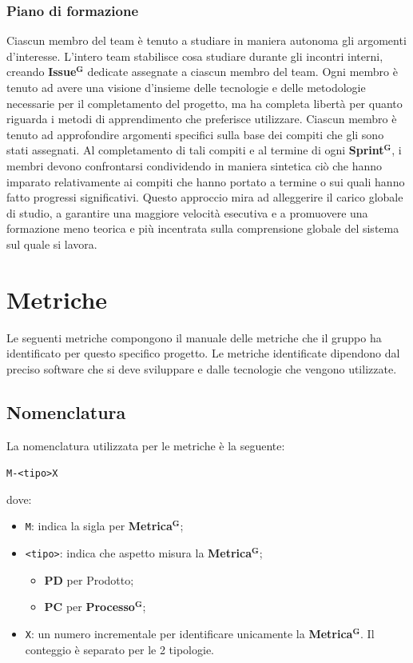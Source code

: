 \documentclass[a4paper,12pt]{article}
\newcommand{\term}[1]{\textbf{#1}$^\mathbf{G}$}
\begin{document}
\subsubsection{Piano di formazione}
Ciascun membro del team è tenuto a studiare in maniera autonoma gli argomenti d'interesse. L'intero team stabilisce cosa studiare durante gli incontri interni, creando \term{Issue} dedicate assegnate a ciascun membro del team. Ogni membro è tenuto ad avere una visione d'insieme delle tecnologie e delle metodologie necessarie per il completamento del progetto, ma ha completa libertà per quanto riguarda i metodi di apprendimento che preferisce utilizzare. Ciascun membro è tenuto ad approfondire argomenti specifici sulla base dei compiti che gli sono stati assegnati. Al completamento di tali compiti e al termine di ogni \term{Sprint}, i membri devono confrontarsi condividendo in maniera sintetica ciò che hanno imparato relativamente ai compiti che hanno portato a termine o sui quali hanno fatto progressi significativi. Questo approccio mira ad alleggerire il carico globale di studio, a garantire una maggiore velocità esecutiva e a promuovere una formazione meno teorica e più incentrata sulla comprensione globale del sistema sul quale si lavora. 

\section{Metriche} \label{sec:elenco-metriche}
Le seguenti metriche compongono il manuale delle metriche che il gruppo ha identificato per questo specifico progetto. Le metriche identificate dipendono dal preciso software che si deve sviluppare e dalle tecnologie che vengono utilizzate.

\subsection{Nomenclatura}
La nomenclatura utilizzata per le metriche è la seguente:
\begin{center}
    \texttt{M-<tipo>X}
\end{center}
dove:
\begin{itemize}
    \item \texttt{M}: indica la sigla per \textbf{\term{Metrica}};
    \item \texttt{<tipo>}: indica che aspetto misura la \term{Metrica};
    \begin{itemize}
        \item \textbf{PD} per Prodotto;
        \item \textbf{PC} per \term{Processo};
    \end{itemize}
    \item \texttt{X}: un numero incrementale per identificare unicamente la \term{Metrica}. Il conteggio è separato per le 2 tipologie.
\end{itemize}
\end{document}
